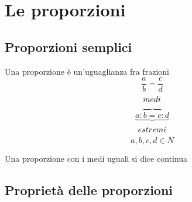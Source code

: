 \chapter{Le proporzioni}
\label{sec:LeProporzioni}
\section{Proporzioni semplici}
\label{sec:ProporzioniSemplici}


Una proporzione è un'uguaglianza fra frazioni
\[\dfrac{a}{b}=\dfrac{c}{d}\]
\[medi\index{Proporzione!medi}\]
\[{\underbrace{a:\overbrace{b=c}:d}}\]
\[estremi\index{Proporzione!estremi}\]
\[a,b,c,d\in N\]

Una proporzione con i medi uguali si dice continua

\section{Proprietà delle proporzioni}
\label{sec:ProprietaDelleProporzioni}
